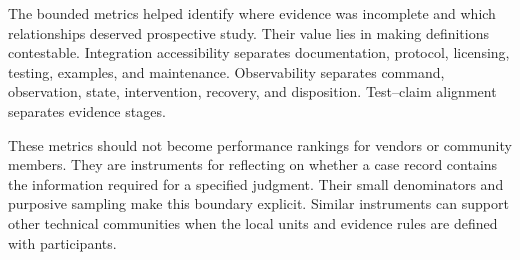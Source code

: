 The bounded metrics helped identify where evidence was incomplete and which relationships deserved prospective study. Their value lies in making definitions contestable. Integration accessibility separates documentation, protocol, licensing, testing, examples, and maintenance. Observability separates command, observation, state, intervention, recovery, and disposition. Test--claim alignment separates evidence stages.

These metrics should not become performance rankings for vendors or community members. They are instruments for reflecting on whether a case record contains the information required for a specified judgment. Their small denominators and purposive sampling make this boundary explicit. Similar instruments can support other technical communities when the local units and evidence rules are defined with participants.

